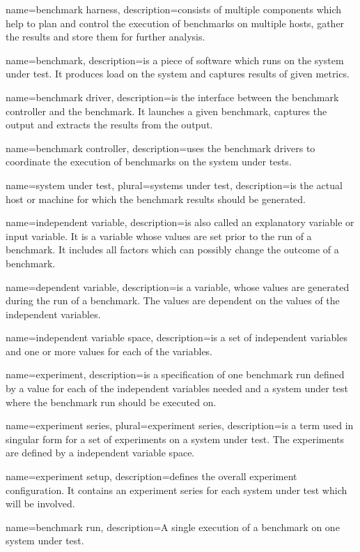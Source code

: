  {
  name={benchmark harness},
  description={consists of multiple components which help to plan and control the execution of
benchmarks on multiple hosts, gather the results and store them for further
analysis.}
}

 {
  name={benchmark},
  description={is a piece of software which runs on the system under test. It
produces load on the system and captures results of given metrics.}
}

 {
  name={benchmark driver},
  description={is the interface between the \gls{benchmark controller} and
the \gls{benchmark}. It launches a given benchmark, captures the output and
extracts the results from the output.}
}

 {
  name={benchmark controller},
  description={uses the \glspl{benchmark driver} to coordinate the execution of 
\glspl{benchmark} on the \glspl{system under test}.}
}

 {
  name={system under test},
  plural={systems under test},
  description={is the actual host or machine for which the benchmark results should
be generated.}
}

 {
  name={independent variable},
  description={is also called an explanatory variable or input variable. It is a
variable whose values are set prior to the run of a benchmark. It includes all
factors which can possibly change the outcome of a benchmark.}
}

 {
  name={dependent variable},
  description={is a variable, whose values are generated during the run of a
benchmark. The values are dependent on the values of the \glspl{independent
variable}.}
}

 {
 name={independent variable space},
 description={is a set of independent variables and one or more values for each of
the variables.}
}

 {
  name={experiment},
  description={is a specification of one benchmark run defined by a value for
each of the \glspl{independent variable} needed and a \gls{system under test}
where the benchmark run should be executed on.}
}

 {
 name={experiment series},
 plural={experiment series},
 description={is a term used in singular form for a set of experiments on a
system under test. The experiments are defined by a \gls{independent variable
space}.}
}

 {
  name={experiment setup},
  description={defines the overall experiment configuration. It contains an
\gls{experiment series} for each system under test which will be involved.}
 }
 
  {
 name={benchmark run},
 description={A single execution of a \gls{benchmark} on one \gls{system under test}.}
 }
